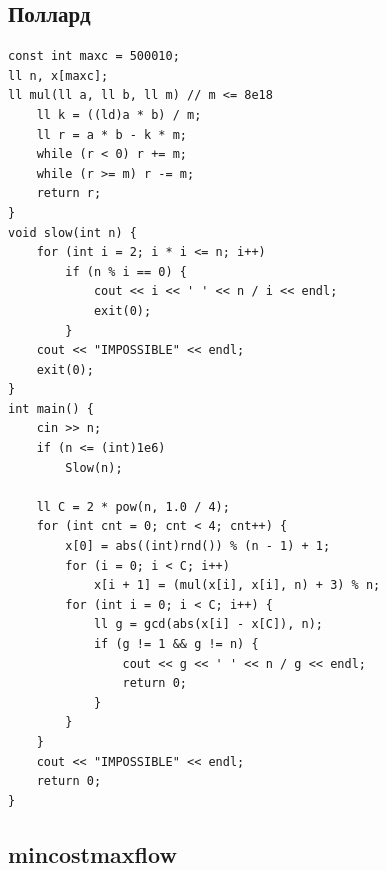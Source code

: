 \documentclass[10pt, portrait,letterpaper]{article}
\begin{document}
\subsection{Поллард}

\begin{verbatim}
const int maxc = 500010;
ll n, x[maxc];
ll mul(ll a, ll b, ll m) // m <= 8e18
    ll k = ((ld)a * b) / m;
    ll r = a * b - k * m;
    while (r < 0) r += m;
    while (r >= m) r -= m;
    return r;
}
void slow(int n) {
    for (int i = 2; i * i <= n; i++)
        if (n % i == 0) {
            cout << i << ' ' << n / i << endl;
            exit(0);
        }
    cout << "IMPOSSIBLE" << endl;
    exit(0);
}
int main() {
    cin >> n;
    if (n <= (int)1e6)
        Slow(n);

    ll C = 2 * pow(n, 1.0 / 4);
    for (int cnt = 0; cnt < 4; cnt++) {
        x[0] = abs((int)rnd()) % (n - 1) + 1;
        for (i = 0; i < C; i++)
            x[i + 1] = (mul(x[i], x[i], n) + 3) % n;
        for (int i = 0; i < C; i++) {
            ll g = gcd(abs(x[i] - x[C]), n);
            if (g != 1 && g != n) {
                cout << g << ' ' << n / g << endl;
                return 0;
            }
        }
    }
    cout << "IMPOSSIBLE" << endl;
    return 0;
}
\end{verbatim}


\subsection{mincostmaxflow}
\end{document}
